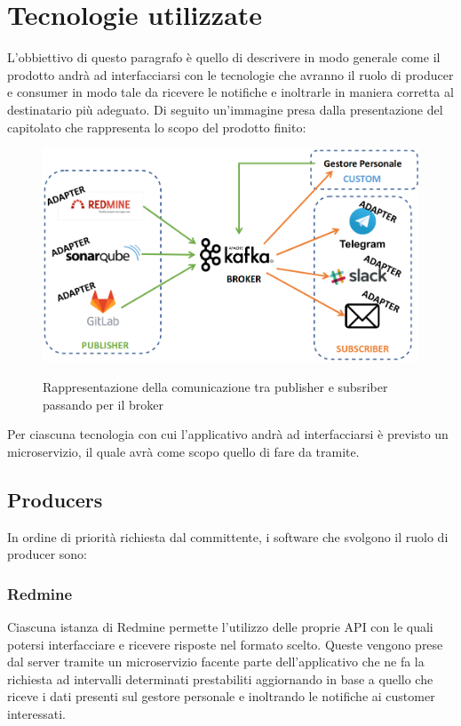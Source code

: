 \newpage
\section{Tecnologie utilizzate}
	L'obbiettivo di questo paragrafo è quello di descrivere in modo generale come il prodotto andrà ad interfacciarsi con le tecnologie che avranno il ruolo di producer e consumer in modo tale da ricevere le notifiche e inoltrarle in maniera corretta al destinatario più adeguato.
	Di seguito un'immagine presa dalla presentazione del capitolato che rappresenta lo scopo del prodotto finito:
	\vspace{-0.4cm}
	\begin{figure}[H]
		\centering
		\includegraphics[width=\columnwidth]{img/butterfly.png}\\
		\caption{Rappresentazione della comunicazione tra publisher e subsriber passando per il broker}
	\end{figure}

	Per ciascuna tecnologia con cui l'applicativo andrà ad interfacciarsi è previsto un microservizio, il quale avrà come scopo quello di fare da tramite.

	\subsection{Producers}
		In ordine di priorità richiesta dal committente, i software che svolgono il ruolo di producer sono:

		\subsubsection{Redmine}
		Ciascuna istanza di Redmine permette l'utilizzo delle proprie API con le quali potersi interfacciare e ricevere risposte nel formato scelto.
		Queste vengono prese dal server tramite un microservizio facente parte dell'applicativo che ne fa la richiesta ad intervalli determinati prestabiliti aggiornando in base a quello che riceve i dati presenti sul gestore personale e inoltrando le notifiche ai customer interessati.
		
